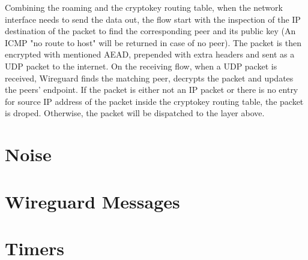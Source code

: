   Combining the roaming and the cryptokey routing table, when the network interface needs
  to send the data out, the flow start with the inspection of the IP destination of the packet 
  to find the corresponding peer and its public key (An ICMP "no route to host" will be returned
  in case of no peer). The packet is then encrypted with mentioned AEAD, prepended with
  extra headers and sent as a UDP packet to the internet. On the receiving flow, when a UDP packet
  is received, Wireguard finds the matching peer, decrypts the packet and updates the peers' endpoint.
  If the packet is either not an IP packet or there is no entry for source IP address of the packet
  inside the cryptokey routing table, the packet is droped. Otherwise, the packet will be dispatched
  to the layer above.
\section{Noise} \label{w2}
\section{Wireguard Messages} \label{w3}
\section{Timers} \label{w4}